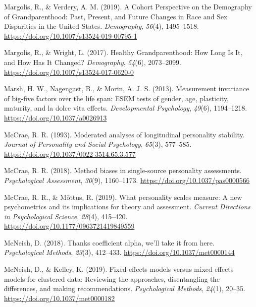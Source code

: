 \documentclass[
  english,
  man,floatsintext]{apa7}
\begin{document}
\leavevmode\hypertarget{ref-margolisCohortPerspectiveDemography2019}{}%
Margolis, R., \& Verdery, A. M. (2019). A Cohort Perspective on the Demography of Grandparenthood: Past, Present, and Future Changes in Race and Sex Disparities in the United States. \emph{Demography}, \emph{56}(4), 1495--1518. \url{https://doi.org/10.1007/s13524-019-00795-1}

\leavevmode\hypertarget{ref-margolisHealthyGrandparenthoodHow2017}{}%
Margolis, R., \& Wright, L. (2017). Healthy Grandparenthood: How Long Is It, and How Has It Changed? \emph{Demography}, \emph{54}(6), 2073--2099. \url{https://doi.org/10.1007/s13524-017-0620-0}

\leavevmode\hypertarget{ref-marshMeasurementInvarianceBigfive2013}{}%
Marsh, H. W., Nagengast, B., \& Morin, A. J. S. (2013). Measurement invariance of big-five factors over the life span: ESEM tests of gender, age, plasticity, maturity, and la dolce vita effects. \emph{Developmental Psychology}, \emph{49}(6), 1194--1218. \url{https://doi.org/10.1037/a0026913}

\leavevmode\hypertarget{ref-mccraeModeratedAnalysesLongitudinal1993}{}%
McCrae, R. R. (1993). Moderated analyses of longitudinal personality stability. \emph{Journal of Personality and Social Psychology}, \emph{65}(3), 577--585. \url{https://doi.org/10.1037/0022-3514.65.3.577}

\leavevmode\hypertarget{ref-mccraeMethodBiasesSinglesource2018}{}%
McCrae, R. R. (2018). Method biases in single-source personality assessments. \emph{Psychological Assessment}, \emph{30}(9), 1160--1173. \url{https://doi.org/10.1037/pas0000566}

\leavevmode\hypertarget{ref-mccraeWhatPersonalityScales2019}{}%
McCrae, R. R., \& Mõttus, R. (2019). What personality scales measure: A new psychometrics and its implications for theory and assessment. \emph{Current Directions in Psychological Science}, \emph{28}(4), 415--420. \url{https://doi.org/10.1177/0963721419849559}

\leavevmode\hypertarget{ref-mcneishThanksCoefficientAlpha2018}{}%
McNeish, D. (2018). Thanks coefficient alpha, we'll take it from here. \emph{Psychological Methods}, \emph{23}(3), 412--433. \url{https://doi.org/10.1037/met0000144}

\leavevmode\hypertarget{ref-mcneishFixedEffectsModels2019}{}%
McNeish, D., \& Kelley, K. (2019). Fixed effects models versus mixed effects models for clustered data: Reviewing the approaches, disentangling the differences, and making recommendations. \emph{Psychological Methods}, \emph{24}(1), 20--35. \url{https://doi.org/10.1037/met0000182}
\end{document}
